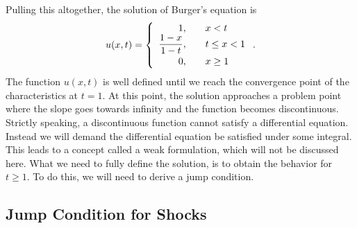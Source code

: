 
Pulling this altogether, the solution of Burger's equation is
\begin{align}
  u(x,t) = \left\{ \begin{array}{r l} 
  1, & \quad x < t \\
  \dfrac{1 - x}{1 - t}, & \quad t \le x < 1 \vspace{0.2em} \\
  0, & \quad x \ge 1 \\ \end{array} \right. . 
\end{align}
The function $u(x,t)$ is well defined until we reach the convergence point of the characteristics at $t = 1$. At this point, the solution approaches a problem point where the slope goes towards infinity and the function becomes discontinuous. Strictly speaking, a discontinuous function cannot satisfy a differential equation. Instead we will demand the differential equation be satisfied under some integral. This leads to a concept called a weak formulation, which will not be discussed here. What we need to fully define the solution, is to obtain the behavior for $t \ge 1$. To do this, we will need to derive a jump condition.

\subsection{Jump Condition for Shocks}

